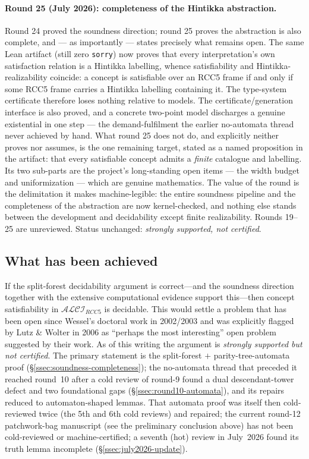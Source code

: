 \documentclass[
]{ceurart}
\theoremstyle{definition}
\newcommand{\ALCIRCC}[1]{\ensuremath{\mathcal{ALCI}_{\mathit{RCC#1}}}}
\begin{document}
\paragraph{Round 25 (July 2026): completeness of the Hintikka
abstraction.}
Round 24 proved the soundness direction; round 25 proves the
abstraction is also complete, and --- as importantly --- states
precisely what remains open.  The same Lean artifact (still zero
\texttt{sorry}) now proves that every interpretation's own
satisfaction relation is a Hintikka labelling, whence satisfiability
and Hintikka-realizability coincide: a concept is satisfiable over an
RCC5 frame if and only if some RCC5 frame carries a Hintikka labelling
containing it.  The type-system certificate therefore loses nothing
relative to models.  The certificate/generation interface is also
proved, and a concrete two-point model discharges a genuine
existential in one step --- the demand-fulfilment the earlier
no-automata thread never achieved by hand.  What round 25 does not do,
and explicitly neither proves nor assumes, is the one remaining
target, stated as a named proposition in the artifact: that every
satisfiable concept admits a \emph{finite} catalogue and labelling.
Its two sub-parts are the project's long-standing open items --- the
width budget and uniformization --- which are genuine mathematics.
The value of the round is the delimitation it makes machine-legible:
the entire soundness pipeline and the completeness of the abstraction
are now kernel-checked, and nothing else stands between the
development and decidability except finite realizability.  Rounds
19--25 are unreviewed.  Status unchanged: \emph{strongly supported,
not certified}.

\subsection{What has been achieved}

If the split-forest decidability argument is correct---and the
soundness direction together with the extensive computational
evidence support this---then concept satisfiability in
$\ALCIRCC{5}$ is decidable.  This would settle a problem that
has been open since Wessel's doctoral work in 2002/2003 and was
explicitly flagged by Lutz \& Wolter in 2006 as ``perhaps the
most interesting'' open problem suggested by their work.  As of
this writing the argument is \emph{strongly supported but not
certified}.  The primary statement is the split-forest $+$
parity-tree-automata proof (\S\ref{ssec:soundness-completeness}); the
no-automata thread that preceded it reached round~10 after a cold
review of round-9 found a dual descendant-tower defect and two
foundational gaps (\S\ref{ssec:round10-automata}), and its repairs
reduced to automaton-shaped lemmas.  That automata proof was itself then
cold-reviewed twice (the 5th and 6th cold reviews) and repaired; the current
round-12 patchwork-bag manuscript (see the preliminary conclusion above) has
not been cold-reviewed or machine-certified; a seventh (hot) review in
July~2026 found its truth lemma incomplete (\S\ref{ssec:july2026-update}).
\end{document}
